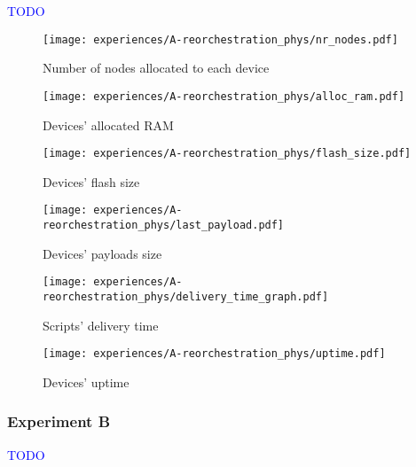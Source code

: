 \textcolor{blue}{TODO}

\begin{figure}[h]
\centering
\texttt{[image: experiences/A-reorchestration\_phys/nr\_nodes.pdf]}
\caption[Number of nodes allocated to each device]{Number of nodes allocated to each device}\label{fig:reorchestration_phys_nr_nodes}
\end{figure}
    
\begin{figure}[h]
\centering
\texttt{[image: experiences/A-reorchestration\_phys/alloc\_ram.pdf]}
\caption[Devices' allocated RAM]{Devices' allocated RAM}\label{fig:reorchestration_phys_alloc_ram}
\end{figure}

\begin{figure}[h]
\centering
\texttt{[image: experiences/A-reorchestration\_phys/flash\_size.pdf]}
\caption[Devices' flash size]{Devices' flash size}\label{fig:reorchestration_phys_flash_size}
\end{figure}

\begin{figure}[h]
\centering
\texttt{[image: experiences/A-reorchestration\_phys/last\_payload.pdf]}
\caption[Devices' payloads size]{Devices' payloads size}\label{fig:reorchestration_phys_last_payload}
\end{figure}

\begin{figure}[h]
\centering
\texttt{[image: experiences/A-reorchestration\_phys/delivery\_time\_graph.pdf]}
\caption[Scripts' delivery time]{Scripts' delivery time}\label{fig:reorchestration_phys_script_delivery_time}
\end{figure}

\begin{figure}[h]
\centering
\texttt{[image: experiences/A-reorchestration\_phys/uptime.pdf]}
\caption[Devices' uptime]{Devices' uptime}\label{fig:reorchestration_phys_uptime}
\end{figure}


\subsubsection{Experiment B}

\textcolor{blue}{TODO}


